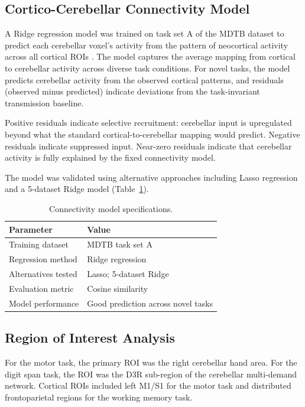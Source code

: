 \documentclass[11pt]{article}
\begin{document}
\subsection{Cortico-Cerebellar Connectivity Model}

A Ridge regression model was trained on task set A of the MDTB dataset to predict each cerebellar voxel's activity from the pattern of neocortical activity across all cortical ROIs \citep{king2019}. The model captures the average mapping from cortical to cerebellar activity across diverse task conditions. For novel tasks, the model predicts cerebellar activity from the observed cortical patterns, and residuals (observed minus predicted) indicate deviations from the task-invariant transmission baseline.

Positive residuals indicate selective recruitment: cerebellar input is upregulated beyond what the standard cortical-to-cerebellar mapping would predict. Negative residuals indicate suppressed input. Near-zero residuals indicate that cerebellar activity is fully explained by the fixed connectivity model.

The model was validated using alternative approaches including Lasso regression and a 5-dataset Ridge model (Table~\ref{tab:model}).

\begin{table}[h]
\centering
\caption{Connectivity model specifications.}
\label{tab:model}
\begin{tabular}{ll}
\toprule
Parameter & Value \\
\midrule
Training dataset & MDTB task set A \\
Regression method & Ridge regression \\
Alternatives tested & Lasso; 5-dataset Ridge \\
Evaluation metric & Cosine similarity \\
Model performance & Good prediction across novel tasks \\
\bottomrule
\end{tabular}
\end{table}

\subsection{Region of Interest Analysis}

For the motor task, the primary ROI was the right cerebellar hand area. For the digit span task, the ROI was the D3R sub-region of the cerebellar multi-demand network. Cortical ROIs included left M1/S1 for the motor task and distributed frontoparietal regions for the working memory task.
\end{document}
